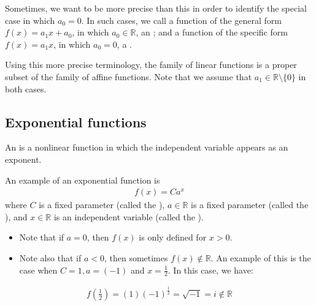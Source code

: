 \documentclass[letterpaper,10pt,english]{jupyterBook}
\begin{document}
\sphinxAtStartPar
Sometimes, we want to be more precise than this in order to identify the special case in which \(a_0 = 0\). In such cases, we call a function of the general form \(f(x) = a_1 x + a_0\), in which \(a_0 \in \mathbb{R}\), an ; and a function of the specific form \(f(x) = a_1 x\), in which \(a_0 = 0\), a .

\sphinxAtStartPar
Using this more precise terminology, the family of linear functions is a proper subset of the family of affine functions. Note that we assume that \(a_1 \in \mathbb{R} \setminus \{0\}\) in both cases.


\subsection{Exponential functions}
\label{\detokenize{03.mappings_functions_correspondences:exponential-functions}}
\sphinxAtStartPar
An  is a non\sphinxhyphen{}linear function in which the independent variable appears as an exponent.

\sphinxAtStartPar
An example of an exponential function is
\begin{equation*}
\begin{split}
f(x) = Ca^x
\end{split}
\end{equation*}
\sphinxAtStartPar
where \(C\) is a fixed parameter (called the ), \(a \in \mathbb{R}\) is a fixed parameter (called the ), and \(x \in \mathbb{R}\) is an independent variable (called the ).
\begin{itemize}
\item {} 
\sphinxAtStartPar
Note that if \(a = 0\), then \(f(x)\) is only defined for \(x > 0\).

\item {} 
\sphinxAtStartPar
Note also that if \(a < 0\), then sometimes \(f(x) \notin \mathbb{R}\). An example of this is the case when \(C = 1, a = (−1)\) and \(x = \frac{1}{2}\). In this case, we have:

\end{itemize}
\begin{equation*}
\begin{split}
f(\frac{1}{2}) = (1)(−1)^{\frac{1}{2}} = \sqrt{−1} = i \notin \mathbb{R}
\end{split}
\end{equation*}
\end{document}
